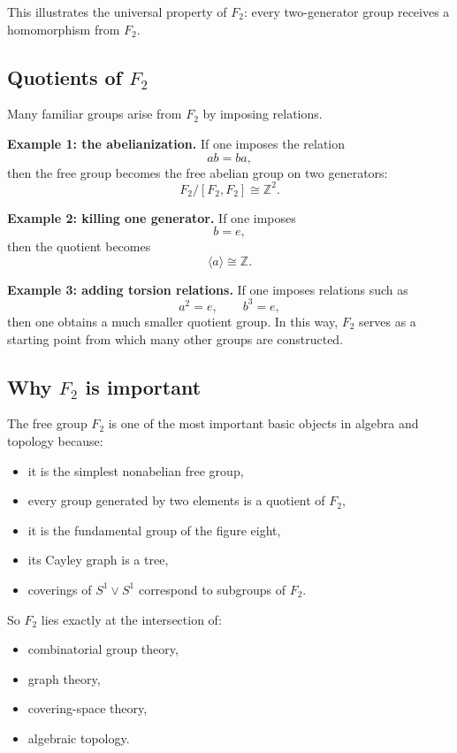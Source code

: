 \documentclass[12pt,a4paper]{article}
\theoremstyle{notespace}
\begin{document}
This illustrates the universal property of \(F_2\): every two-generator group receives a homomorphism from \(F_2\).

\bigskip

\subsection{ Quotients of \texorpdfstring{$F_2$}{F2}}

Many familiar groups arise from \(F_2\) by imposing relations.

\medskip

\textbf{Example 1: the abelianization.}
If one imposes the relation
\[
ab=ba,
\]
then the free group becomes the free abelian group on two generators:
\[
F_2/[F_2,F_2]\cong \mathbb Z^2.
\]

\medskip

\textbf{Example 2: killing one generator.}
If one imposes
\[
b=e,
\]
then the quotient becomes
\[
\langle a\rangle\cong \mathbb Z.
\]

\medskip

\textbf{Example 3: adding torsion relations.}
If one imposes relations such as
\[
a^2=e,\qquad b^3=e,
\]
then one obtains a much smaller quotient group. In this way, \(F_2\) serves as a starting point from which many other groups are constructed.

\bigskip

\subsection{ Why \texorpdfstring{$F_2$}{F2} is important}

The free group \(F_2\) is one of the most important basic objects in algebra and topology because:
\begin{itemize}
	\item it is the simplest nonabelian free group,
	\item every group generated by two elements is a quotient of \(F_2\),
	\item it is the fundamental group of the figure eight,
	\item its Cayley graph is a tree,
	\item coverings of \(S^1\vee S^1\) correspond to subgroups of \(F_2\).
\end{itemize}

So \(F_2\) lies exactly at the intersection of:
\begin{itemize}
	\item combinatorial group theory,
	\item graph theory,
	\item covering-space theory,
	\item algebraic topology.
\end{itemize}
\end{document}
